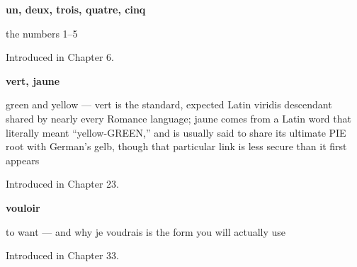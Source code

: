 \noindent\begin{minipage}[t]{\linewidth}
\raggedright
\textbf{un, deux, trois, quatre, cinq}\par
\small the numbers 1–5\par
\footnotesize Introduced in Chapter 6.
\end{minipage}\par\medskip

\noindent\begin{minipage}[t]{\linewidth}
\raggedright
\textbf{vert, jaune}\par
\small green and yellow — vert is the standard, expected Latin viridis descendant shared by nearly every Romance language; jaune comes from a Latin word that literally meant \textquotedblleft{}yellow-GREEN,\textquotedblright{} and is usually said to share its ultimate PIE root with German's gelb, though that particular link is less secure than it first appears\par
\footnotesize Introduced in Chapter 23.
\end{minipage}\par\medskip

\noindent\begin{minipage}[t]{\linewidth}
\raggedright
\textbf{vouloir}\par
\small to want — and why je voudrais is the form you will actually use\par
\footnotesize Introduced in Chapter 33.
\end{minipage}\par\medskip
